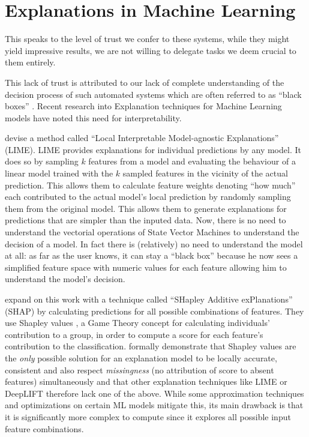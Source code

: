 \documentclass[\version]{l4proj}
\begin{document}
\section{Explanations in Machine Learning}

This speaks to the level of trust we confer to these systems, while they might yield impressive results, we are not willing to delegate tasks we deem crucial to them entirely.

This lack of trust is attributed to our lack of complete understanding of the decision process of such automated systems which are often referred to as ``black boxes'' \autocite{ribeiroWhyShouldTrust2016}.
Recent research into Explanation techniques for Machine Learning models have noted this need for interpretability.

\textcite{ribeiroWhyShouldTrust2016} devise a method called ``Local Interpretable Model-agnostic Explanations'' (LIME).
LIME provides explanations for individual predictions by any model.
It does so by sampling $k$ features from a model and evaluating the behaviour of a linear model trained with the $k$ sampled features in the vicinity of the actual prediction.
This allows them to calculate feature weights denoting ``how much'' each contributed to the actual model's local prediction by randomly sampling them from the original model.
This allows them to generate explanations for predictions that are simpler than the inputed data.
Now, there is no need to understand the vectorial operations of State Vector Machines to understand the decision of a model.
In fact there is (relatively) no need to understand the model at all: as far as the user knows, it can stay a ``black box'' because he now sees a simplified feature space with numeric values for each feature allowing him to understand the model's decision.

\textcite{lundbergUnifiedApproachInterpreting2017} expand on this work with a technique called ``SHapley Additive exPlanations'' (SHAP) by calculating predictions for all possible combinations of features.
They use Shapley values \autocite{shapleyNotesNPersonGame1951}, a Game Theory concept for calculating individuals' contribution to a group, in order to compute a score for each feature's contribution to the classification.
\textcite{lundbergUnifiedApproachInterpreting2017} formally demonstrate that Shapley values are the \textit{only} possible solution for an explanation model to be locally accurate, consistent and also respect \textit{missingness} (no attribution of score to absent features) simultaneously and that other explanation techniques like LIME or DeepLIFT therefore lack one of the above.
While some approximation techniques and optimizations on certain ML models mitigate this, its main drawback is that it is significantly more complex to compute since it explores all possible input feature combinations.
\end{document}
